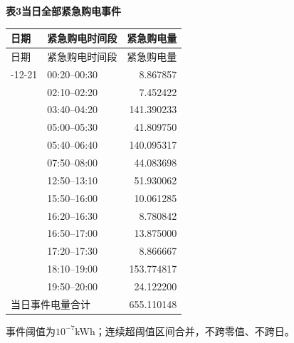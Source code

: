\begin{center}\textbf{表3\quad 当日全部紧急购电事件}\end{center}
\begin{longtable}{llr}\toprule 日期 & 紧急购电时间段 & 紧急购电量\\\midrule\endfirsthead
\toprule 日期 & 紧急购电时间段 & 紧急购电量\\\midrule\endhead
\bottomrule\endfoot
2025-12-21 & 00:20--00:30 & 8.867857\\
 & 02:10--02:20 & 7.452422\\
 & 03:40--04:20 & 141.390233\\
 & 05:00--05:30 & 41.809750\\
 & 05:40--06:40 & 140.095317\\
 & 07:50--08:00 & 44.083698\\
 & 12:50--13:10 & 51.930062\\
 & 15:50--16:00 & 10.061285\\
 & 16:20--16:30 & 8.780842\\
 & 16:50--17:00 & 13.875000\\
 & 17:20--17:30 & 8.866667\\
 & 18:10--19:00 & 153.774817\\
 & 19:50--20:00 & 24.122200\\
\midrule\multicolumn{2}{l}{当日事件电量合计} & 655.110148\\
\end{longtable}
\noindent 事件阈值为$10^{-7}$kWh；连续超阈值区间合并，不跨零值、不跨日。
\endgroup
\clearpage
